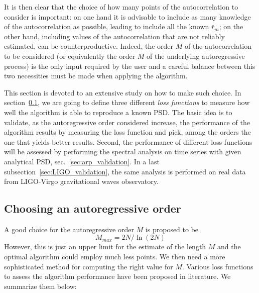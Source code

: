 \documentclass[twocolumn,showpacs,preprintnumbers,nofootinbib,prd,
superscriptaddress,10pt]{revtex4-1}
\begin{document}

It is then clear that the choice of how many points of the autocorrelation to consider is important: on one hand it is advisable to include as many knowledge of the autocorrelation as possible, leading to include all the known $\bar{r}_m$; on the other hand, including values of the autocorrelation that are not reliably estimated, can be counterproductive.
Indeed, the order $M$ of the autocorrelation to be considered (or equivalently the order $M$ of the underlying autoregressive process) is the only input required by the user and a careful balance between this two necessities must be made when applying the algorithm.

This section is devoted to an extensive study on how to make such choice.
In section~\ref{sec:optimizers}, we are going to define three different \textit{loss functions} to measure how well the algorithm is able to reproduce a known PSD.
The basic idea is to validate, as the autoregressive order considered increase, the performance of the algorithm results by measuring the loss function and pick, among the orders the one that yields better results.
Second, the performance of different loss functions will be assessed by performing the spectral analysis on time series with given analytical PSD, sec.~\ref{sec:arp_validation}.
In a last subsection~\ref{sec:LIGO_validation}, the same analysis is performed on real data from LIGO-Virgo gravitational waves observatory.

\subsection{Choosing an autoregressive order}\label{sec:optimizers} 

A good choice for the autoregressive order $M$ is proposed to be \cite{doi:10.1190/1.1440902}
\begin{equation}\label{eq:MMAx}
M_{max} = 2N / \ln{(2N)}
\end{equation}
However, this is just an upper limit for the estimate of the length $M$ and the optimal algorithm could employ much less points.
We then need a more sophisticated method for computing the right value for $M$.
Various loss functions to assess the algorithm performance have been proposed in literature.
We summarize them below:
\end{document}
